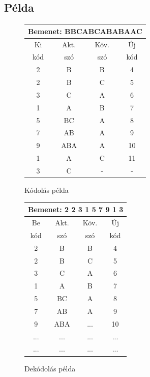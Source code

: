 \documentclass[12pt,a4paper]{article}
\begin{document}
\pagebreak

\subsection{Példa}

\begin{figure}[h]
	\begin{minipage}{.5\textwidth}
		\begin{tabular}{|c|c|c|c|}
			\hline
			\multicolumn{4}{|c|}{Bemenet: BBCABCABABAAC} \\
			\hline
			Ki  & Akt. & Köv. & Új \\
			kód & szó & szó & kód \\
			\hline
			2 & B & B & 4 \\
			\hline
			2 & B & C & 5 \\
			\hline
			3 & C & A & 6 \\
			\hline
			1 & A & B & 7 \\
			\hline
			5 & BC & A & 8 \\
			\hline
			7 & AB & A & 9 \\
			\hline
			9 & ABA & A & 10 \\
			\hline
			1 & A & C & 11 \\
			\hline
			3 & C & - & - \\
			\hline
		\end{tabular}
		\caption{Kódolás példa}
	\end{minipage}
	\begin{minipage}{.5\textwidth}
		\begin{tabular}{|c|c|c|c|}
			\hline
			\multicolumn{4}{|c|}{Bemenet: 2 2 3 1 5 7 9 1 3} \\
			\hline
			Be  & Akt. & Köv. & Új \\
			kód & szó & szó & kód \\
			\hline
			2 & B & B & 4 \\
			\hline
			2 & B & C & 5 \\
			\hline
			3 & C & A & 6 \\
			\hline
			1 & A & B & 7 \\
			\hline
			5 & BC & A & 8 \\
			\hline
			7 & AB & A & 9 \\
			\hline
			9 & ABA & ... & 10 \\
			\hline
			... & ... & ... & ... \\
			\hline
			... & ... & ... & ... \\
			\hline
		\end{tabular}
		\caption{Dekódolás példa}
	\end{minipage}
\end{figure}
\end{document}
